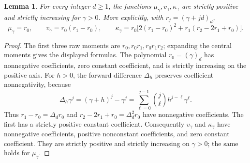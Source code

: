 \documentclass[11pt]{article}
\newtheorem{lemma}[theorem]{Lemma}
\begin{document}
\begin{lemma}\label{lem:cumulants}
For every integer $d\ge1$, the functions
$\mu_\gamma,v_\gamma,\kappa_\gamma$ are strictly positive and
strictly increasing for $\gamma>0$.
More explicitly, with $r_j=(\gamma+jd)_d$,
\[
 \mu_\gamma=r_0,\qquad
 v_\gamma=r_0(r_1-r_0),\qquad
 \kappa_\gamma=
 r_0\bigl[2(r_1-r_0)^2+r_1(r_2-2r_1+r_0)\bigr].          \tag{1}\label{eq:cumulants}
\]
\end{lemma}
\begin{proof}
The first three raw moments are $r_0,r_0r_1,r_0r_1r_2$;
expanding the central moments gives the displayed formulas.
The polynomial $r_0=(\gamma)_d$ has nonnegative coefficients, zero
constant coefficient, and is strictly increasing on the positive axis.
For $h>0$, the forward difference $\Delta_h$ preserves coefficient
nonnegativity, because
\[
 \Delta_h\gamma^j=(\gamma+h)^j-\gamma^j
   =\sum_{\ell=0}^{j-1}\binom j\ell h^{j-\ell}\gamma^\ell .
\]
Thus $r_1-r_0=\Delta_dr_0$ and
$r_2-2r_1+r_0=\Delta_d^2r_0$ have nonnegative coefficients.
The first has a strictly positive constant coefficient.
Consequently $v_\gamma$ and $\kappa_\gamma$ have nonnegative
coefficients, positive nonconstant coefficients, and zero constant
coefficient. They are strictly positive and strictly increasing on
$\gamma>0$; the same holds for $\mu_\gamma$.
\end{proof}
\end{document}
